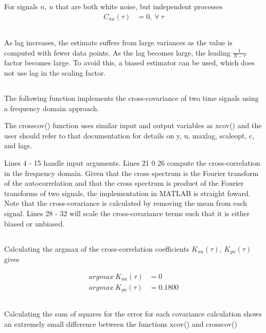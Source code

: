 \documentclass[times,12pt,reqno]{amsart}
\begin{document}
For signals $n$, $u$ that are both white noise, but independent processes
\begin{align*}
    C_{nu}(\tau) &= 0, \: \forall \: \tau
\end{align*}

\subsection{}
As lag increases, the estimate suffers from large variances as the value
is computed with fewer data points. As the lag becomes large, the leading
$\frac{1}{N - \tau}$ factor becomes large. To avoid this, a biased estimator
can be used, which does not use lag in the scaling factor.

\newpage
\subsection{}

The following function implements the cross-covariance of two time signals
using a frequency domain approach.

\lstset{caption=Cross-Covariance Function}


The crosscov() function uses similar input and output variables as xcov() and
the user should refer to that documentation for details on y, u, maxlag,
scaleopt, c, and lags.

Lines 4 - 15 handle input arguments. Lines 21 0 26 compute the
cross-correlation in the frequency domain. Given that the cross spectrum is the
Fourier transform of the autocorrelation and that the cross spectrum is product
of the Fourier transforms of two signals, the implementation in MATLAB is
straight foward. Note that the cross-covariance is calculated by removing the
mean from each signal. Lines 28 - 32 will scale the cross-covariance terms such
that it is either biased or unbiased.

\subsection{}
Calculating the argmax of the cross-correlation coefficients $K_{uu}(\tau)$,
$K_{yu}(\tau)$ gives

\begin{align*}
    argmax \: K_{uu}(\tau) &= 0 \\
    argmax \: K_{yu}(\tau) &= 0.1800
\end{align*}

\subsection{}
Calculating the sum of squares for the error for each covariance calculation
shows an extremely small difference between the functions xcov() and
crosscov()
\end{document}
